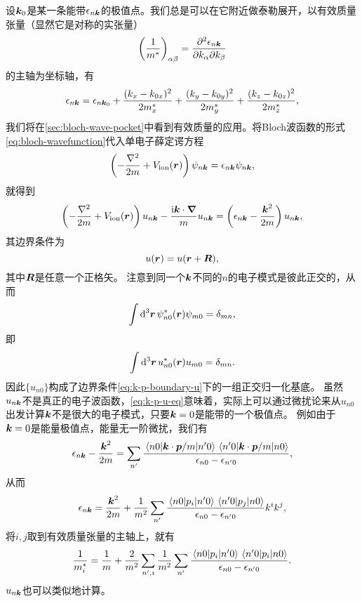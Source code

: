 设$\vb*{k}_0$是某一条能带$\epsilon_{n \vb*{k}}$的极值点。我们总是可以在它附近做泰勒展开，以有效质量张量（显然它是对称的实张量）
\begin{equation}
    \left(\frac{1}{m^*}\right)_{\alpha \beta} = \pdv[2]{\epsilon_{n \vb*{k}}}{k_\alpha}{k_\beta}
    \label{eq:effective-mass}
\end{equation}
的主轴为坐标轴，有
\begin{equation}
    \epsilon_{n \vb*{k}} = \epsilon_{n \vb*{k}_0} + \frac{(k_x - k_{0x})^2}{2 m^*_x} + \frac{(k_y - k_{0y})^2}{2 m^*_y} + \frac{(k_z - k_{0z})^2}{2 m^*_z},
\end{equation}
我们将在\autoref{sec:bloch-wave-pocket}中看到有效质量的应用。将Bloch波函数的形式\eqref{eq:bloch-wavefunction}代入单电子薛定谔方程
\[
    \left( - \frac{\laplacian}{2m} + V_\text{ion}(\vb*{r}) \right) \psi_{n \vb*{k}} = \epsilon_{n \vb*{k}} \psi_{n \vb*{k}},
\]
就得到
\begin{equation}
    \left( - \frac{\laplacian}{2m} + V_\text{ion}(\vb*{r}) \right) u_{n \vb*{k}} - \frac{\ii \vb*{k} \cdot \grad}{m} u_{n \vb*{k}} = \left( \epsilon_{n \vb*{k}} - \frac{{\vb*{k}}^2}{2m}  \right) u_{n \vb*{k}},
    \label{eq:k-p-u-eq}
\end{equation}
其边界条件为
\begin{equation}
    u(\vb*{r}) = u(\vb*{r} + \vb*{R}),
    \label{eq:k-p-boundary-u}
\end{equation}
其中$\vb*{R}$是任意一个正格矢。
注意到同一个$\vb*{k}$不同的$n$的电子模式是彼此正交的，从而
\[
    \int \dd[3]{\vb*{r}} \psi^*_{n 0}(\vb*{r}) \psi_{m 0} = \delta_{mn},
\]
即
\[
    \int \dd[3]{\vb*{r}} u^*_{n 0}(\vb*{r}) u_{m 0} = \delta_{mn}.
\]
因此$\{u_{n 0}\}$构成了边界条件\eqref{eq:k-p-boundary-u}下的一组正交归一化基底。
虽然$u_{n \vb*{k}}$不是真正的电子波函数，\eqref{eq:k-p-u-eq}意味着，实际上可以通过微扰论来从$u_{n0}$出发计算$\vb*{k}$不是很大的电子模式，只要$\vb*{k} = 0$是能带的一个极值点。
例如由于$\vb*{k}=0$是能量极值点，能量无一阶微扰，我们有
\[
    \epsilon_{n \vb*{k}} - \frac{\vb*{k}^2}{2m} = \sum_{n'} \frac{\mel{n 0}{\vb*{k} \cdot \vb*{p} / m}{n' 0} \mel{n' 0}{\vb*{k} \cdot \vb*{p} / m}{n 0}}{\epsilon_{n0} - \epsilon_{n' 0}},
\]
从而
\begin{equation}
    \epsilon_{n \vb*{k}} = \frac{\vb*{k}^2}{2m} + \frac{1}{m^2} \sum_{n'} \frac{\mel{n0}{p_i}{n'0} \mel{n'0}{p_j}{n0}}{\epsilon_{n0} - \epsilon_{n' 0}} k^i k^j,
\end{equation}
将$i, j$取到有效质量张量的主轴上，就有
\begin{equation}
    \frac{1}{m^*_i} = \frac{1}{m} + \frac{2}{m^2} \sum_{n', i} \frac{1}{m^2} \sum_{n'} \frac{\mel{n0}{p_i}{n'0} \mel{n'0}{p_i}{n0}}{\epsilon_{n0} - \epsilon_{n' 0}} .
\end{equation}
$u_{n \vb*{k}}$也可以类似地计算。

